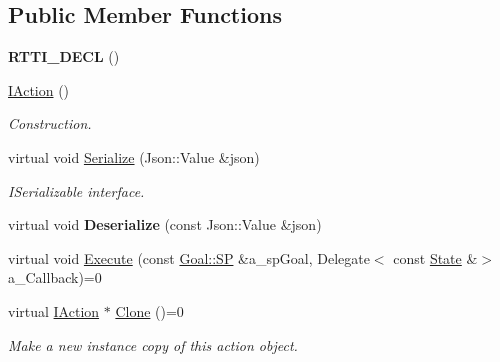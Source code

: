 \subsection*{Public Member Functions}
\begin{DoxyCompactItemize}
\item 
\mbox{\label{class_i_action_aa6aa5b2aa73741c45b40f3b2b09eb5bf}} 
{\bfseries R\+T\+T\+I\+\_\+\+D\+E\+CL} ()
\item 
\mbox{\label{class_i_action_a8add7e99c248231a9f29365a2ff187f6}} 
\hyperlink{class_i_action_a8add7e99c248231a9f29365a2ff187f6}{I\+Action} ()
\begin{DoxyCompactList}\small\item\em Construction. \end{DoxyCompactList}\item 
\mbox{\label{class_i_action_a0431476c3747f9c718f53ba08bd0756a}} 
virtual void \hyperlink{class_i_action_a0431476c3747f9c718f53ba08bd0756a}{Serialize} (Json\+::\+Value \&json)
\begin{DoxyCompactList}\small\item\em I\+Serializable interface. \end{DoxyCompactList}\item 
\mbox{\label{class_i_action_afa3df32b1c1ab62941f407abdb5343a0}} 
virtual void {\bfseries Deserialize} (const Json\+::\+Value \&json)
\item 
virtual void \hyperlink{class_i_action_aef670368aadfdf1a45d2ec845dfc2277}{Execute} (const \hyperlink{class_goal_a818ae12a4d1f28bd433dab2a830a390e}{Goal\+::\+SP} \&a\+\_\+sp\+Goal, Delegate$<$ const \hyperlink{struct_i_action_1_1_state}{State} \&$>$ a\+\_\+\+Callback)=0
\item 
\mbox{\label{class_i_action_ae1e4174cd77aa60609b77139a0f0b082}} 
virtual \hyperlink{class_i_action}{I\+Action} $\ast$ \hyperlink{class_i_action_ae1e4174cd77aa60609b77139a0f0b082}{Clone} ()=0
\begin{DoxyCompactList}\small\item\em Make a new instance copy of this action object. \end{DoxyCompactList}\item 
\mbox{\label{class_i_action_ae2a71820d5dcf4e34c60853947872379}} 

\end{DoxyCompactItemize}
